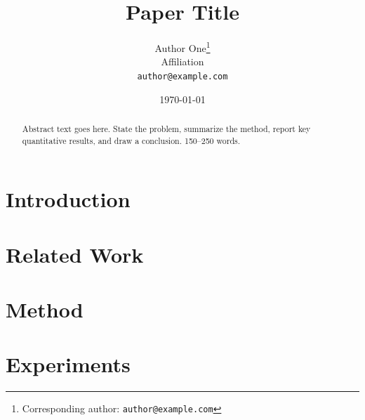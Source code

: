 \documentclass[11pt]{article}
\title{Paper Title}
\author{
  Author One\thanks{Corresponding author: \texttt{author@example.com}} \\
  Affiliation \\
  \texttt{author@example.com}
}
\date{\today}
\begin{document}
\maketitle

\begin{abstract}
Abstract text goes here. State the problem, summarize the method, report key
quantitative results, and draw a conclusion. 150--250 words.
\end{abstract}

\section{Introduction}
\label{sec:introduction}


\section{Related Work}
\label{sec:related-work}


\section{Method}
\label{sec:method}


\section{Experiments}
\label{sec:experiments}
\end{document}
